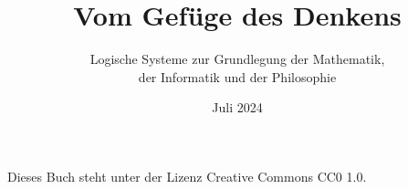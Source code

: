 \documentclass[paper=186mm:234mm,pagesize=auto,fleqn,11pt,dvipdfmx]{scrbook}
\title{Vom Gefüge des Denkens}
\subtitle{Logische Systeme zur Grundlegung der Mathematik,\\
der Informatik und der Philosophie}
\date{Juli 2024}
\theoremstyle{rmbox}
\numberwithin{Definition}{chapter}
\numberwithin{Satz}{chapter}
\begin{document}
\renewcommand{\figurename}{Abb.}
\renewcommand{\thepage}{C\arabic{page}}


\newpage
\thispagestyle{empty}
\mbox{}

\newpage
\addtocounter{page}{-2}
\renewcommand{\thepage}{\arabic{page}}
\thispagestyle{empty}

\maketitle


\noindent
Dieses Buch steht unter der Lizenz Creative Commons CC0 1.0.

\tableofcontents















\printindex
\end{document}
